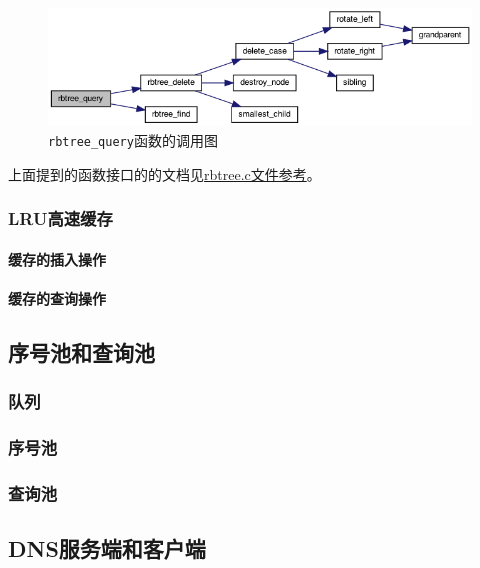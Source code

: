 \documentclass[lang=cn,11pt,a4paper,cite=authornum]{paper}
\begin{document}
\begin{figure}[htbp]

    \centering
    \includegraphics[width=0.8\linewidth]{./APIdoc/rbtree_8c_a7460cf092b0132ece0a692cd84a26456_cgraph.png}
    \caption{\texttt{rbtree_query}函数的调用图\label{fig:rbtree_query_call}}

\end{figure}

上面提到的函数接口的的文档见\href{run:./APIdoc/rbtree_8c.html}{rbtree.c文件参考}。

\subsubsection{LRU高速缓存}

\paragraph{缓存的插入操作}

\paragraph{缓存的查询操作}

\subsection{序号池和查询池}

\subsubsection{队列}

\subsubsection{序号池}

\subsubsection{查询池}

\subsection{DNS服务端和客户端}
\end{document}
